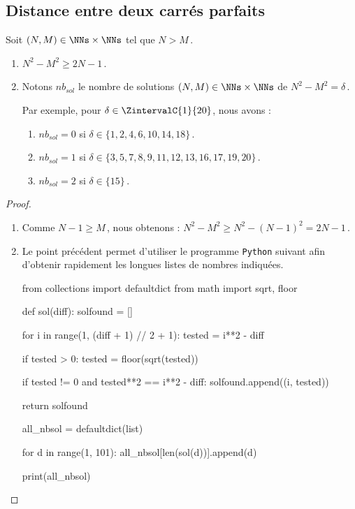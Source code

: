 

\subsection{Distance entre deux carrés parfaits}

\begin{fact} \label{diff-square-ko}
	Soit $(N, M) \in \NNs \times \NNs$ tel que $N > M$\,.
	\begin{enumerate}
		\item $N^2 - M^2 \geq 2N - 1$\,.
		
		\item Notons $nb_{sol}$ le nombre de solutions $(N, M) \in \NNs \times \NNs$ de $N^2 - M^2 = \delta$\,.
		
		\smallskip
		\noindent
		Par exemple, pour $\delta \in \ZintervalC{1}{20}$, nous avons :
		\begin{enumerate}
			\item $nb_{sol}= 0$ si $\delta \in \{ 1, 2, 4, 6, 10, 14, 18\}$\,.

			\item $nb_{sol}= 1$ si $\delta \in \{ 3, 5, 7, 8, 9, 11, 12, 13, 16, 17, 19, 20 \}$\,.

			\item $nb_{sol}= 2$ si $\delta \in \{ 15 \}$\,.
		\end{enumerate}
	\end{enumerate}
\end{fact}


\begin{proof}
	\leavevmode
	
	\vspace{-1ex}
	\begin{enumerate}
		\item Comme $N - 1 \geq M$\,, nous obtenons :
		$N^2 - M^2 \geq N^2 - (N - 1)^2 = 2N - 1$\,.

		\item Le point précédent permet d'utiliser le programme \verb#Python# suivant afin d'obtenir rapidement les longues listes de nombres indiquées.

\bgroup
\small
\begin{Python}
from collections import defaultdict
from math        import sqrt, floor

def sol(diff):
    solfound = []

    for i in range(1, (diff + 1) // 2 + 1):
        tested = i**2 - diff
        
        if tested > 0:
            tested = floor(sqrt(tested))

        	if tested != 0 and tested**2 == i**2 - diff:
                solfound.append((i, tested))

    return solfound

all_nbsol = defaultdict(list)

for d in range(1, 101):
    all_nbsol[len(sol(d))].append(d)

print(all_nbsol)
\end{Python}
\egroup	

		\qedhere
	\end{enumerate}
\end{proof}


